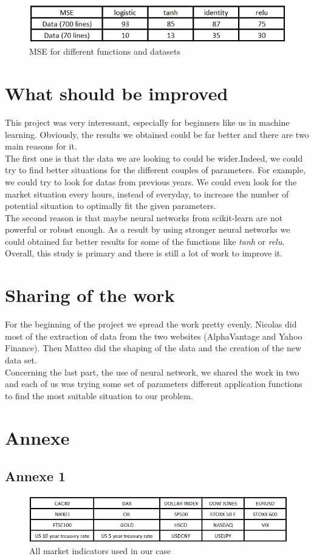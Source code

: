 \documentclass[]{article}
\begin{document}
\begin{figure}[hbt!]
	\center{}
	\includegraphics[scale=0.8]{image/results.png}
	\caption{MSE for different functions and datasets}
\end{figure}


\section{What should be improved}
\vskip 0.5cm
This project was very interessant, especially for beginners like us in machine learning. Obviously, the results we obtained could be far better and there are two main reasons for it. \\
The first one is that the data we are looking to could be wider.Indeed, we could try to find better situations for the different couples of parameters. For example, we could try to look for datas from previous years. We could even look for the market situation every hours, instead of everyday, to increase the number of potential situation to optimally fit the given parameters. \\
The second reason is that maybe neural networks from scikit-learn are not powerful or robust enough. As a result by using stronger neural networks we could obtained far better results for some of the functions like \textit{tanh} or \textit{relu}. \\
Overall, this study is primary and there is still a lot of work to improve it.


\section{Sharing of the work}

\vskip 0.5cm
For the beginning of the project we spread the work pretty evenly.
Nicolas did most of the extraction of data from the two websites (AlphaVantage and Yahoo Finance). 
Then Matteo did the shaping of the data and the creation of the new data set.\\
Concerning the last part, the use of neural network, we shared the work in two and each of us was trying some set of parameters different application functions to find the most suitable situation to our problem.

\section{Annexe}
\subsection{Annexe 1} 
\begin{figure}[hbt!]
	\center{}
	\includegraphics[scale=0.5]{image/marketSituation.png}
	\caption{All market indicators used in our case}
\end{figure}
\end{document}
